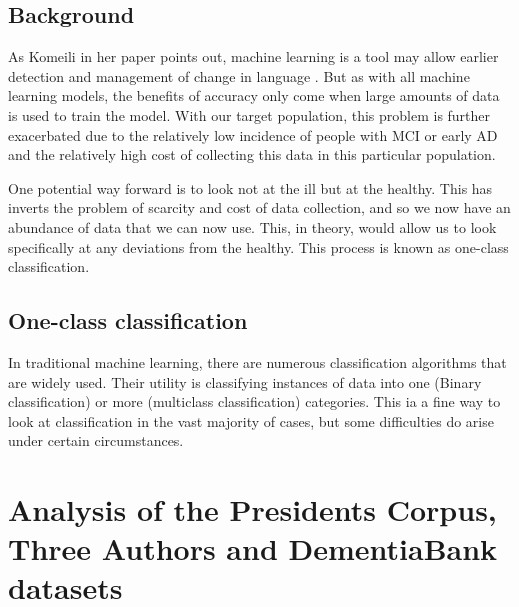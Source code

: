 \documentclass[10pt, letterpaper, twoside, openany]{thesis}
\begin{document}
\section{Background}
As Komeili in her paper points out, machine learning is a tool may allow earlier detection and management of change in language \cite{Komeili2019}. But as with all machine learning models, the benefits of accuracy only come when large amounts of data is used to train the model. With our target population, this problem is further exacerbated due to the relatively low incidence of people with MCI or early AD and the relatively high cost of collecting this data in this particular population. 
\par 
One potential way forward is to look not at the ill but at the healthy. This has inverts the problem of scarcity and cost of data collection, and so we now have an abundance of data that we can now use. This, in theory, would allow us to look specifically at any deviations from the healthy. This process is known as one-class classification.
\par 
 
\section{One-class classification}
In traditional machine learning, there are numerous classification algorithms that are widely used. Their utility is classifying instances of data into one (Binary classification) or more (multiclass classification) categories. This ia a fine way to look at classification in the vast majority of cases, but some difficulties do arise under certain circumstances. 

\chapter{Analysis of the Presidents Corpus, Three Authors and DementiaBank datasets}
\end{document}
